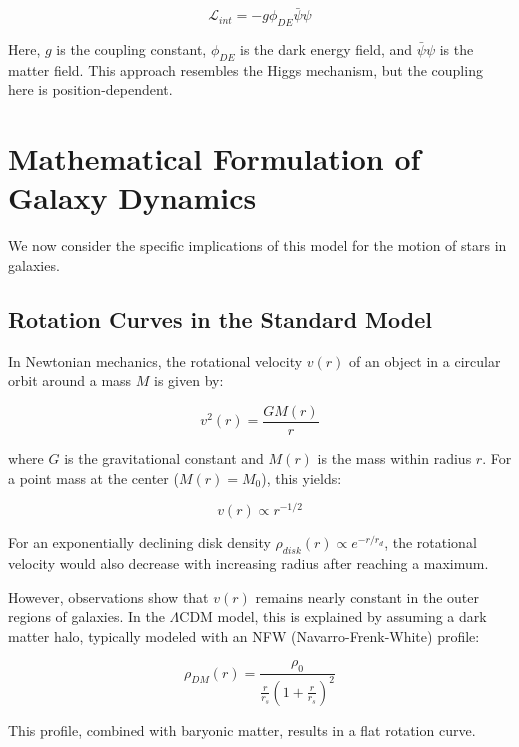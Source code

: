 \documentclass[a4paper,12pt]{article}
\begin{document}
\begin{equation}
	\mathcal{L}_{int} = -g \phi_{DE} \bar{\psi}\psi
\end{equation}

Here, $g$ is the coupling constant, $\phi_{DE}$ is the dark energy field, and $\bar{\psi}\psi$ is the matter field. This approach resembles the Higgs mechanism, but the coupling here is position-dependent.\\

\section{Mathematical Formulation of Galaxy Dynamics}

We now consider the specific implications of this model for the motion of stars in galaxies.

\subsection{Rotation Curves in the Standard Model}

In Newtonian mechanics, the rotational velocity $v(r)$ of an object in a circular orbit around a mass $M$ is given by:

\begin{equation}
	v^2(r) = \frac{GM(r)}{r}
\end{equation}

where $G$ is the gravitational constant and $M(r)$ is the mass within radius $r$. For a point mass at the center ($M(r) = M_0$), this yields:

\begin{equation}
	v(r) \propto r^{-1/2}
\end{equation}

For an exponentially declining disk density $\rho_{disk}(r) \propto e^{-r/r_d}$, the rotational velocity would also decrease with increasing radius after reaching a maximum.

However, observations show that $v(r)$ remains nearly constant in the outer regions of galaxies. In the $\Lambda$CDM model, this is explained by assuming a dark matter halo, typically modeled with an NFW (Navarro-Frenk-White) profile:

\begin{equation}
	\rho_{DM}(r) = \frac{\rho_0}{\frac{r}{r_s}\left(1 + \frac{r}{r_s}\right)^2}
\end{equation}

This profile, combined with baryonic matter, results in a flat rotation curve.
\end{document}
